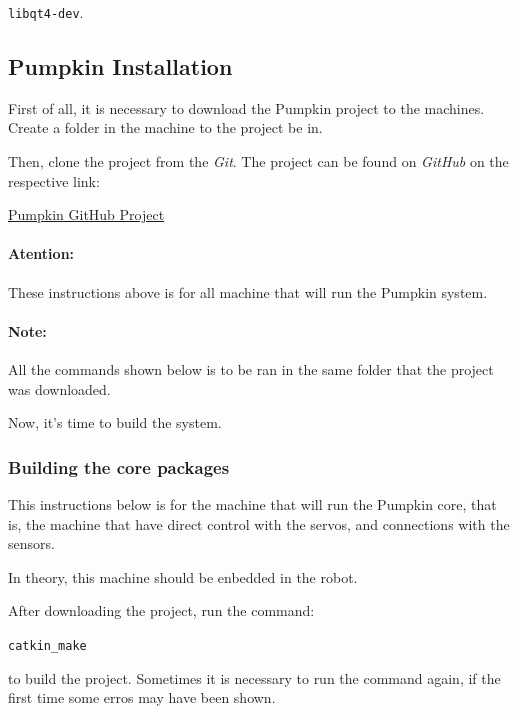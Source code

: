 \documentclass[oneside,a4paper,titlepage]{article}
\begin{document}
\begin{center}
\texttt{libqt4-dev}.
\end{center}

\subsection{Pumpkin Installation}

First of all, it is necessary to download the Pumpkin project to the machines. Create a folder in the machine to the project be in.

Then, clone the project from the \emph{Git}. The project can be found on \emph{GitHub} on the respective link:

\begin{center}
\href{https://github.com/bioinroboticsuottawa/pumpkin\_ws.git}{Pumpkin GitHub Project}
\end{center}

\paragraph{Atention: } These instructions above is for all machine that will run the Pumpkin system.

\paragraph{Note: } All the commands shown below is to be ran in the same folder that the project was downloaded.

Now, it's time to build the system.

\subsubsection{Building the core packages}

This instructions below is for the machine that will run the Pumpkin core, that is, the machine that have direct control with the servos, and connections with the sensors.

In theory, this machine should be enbedded in the robot.

After downloading the project, run the command:

\begin{center}
\texttt{catkin\_make}
\end{center}

to build the project. Sometimes it is necessary to run the command again, if the first time some erros may have been shown.
\end{document}
